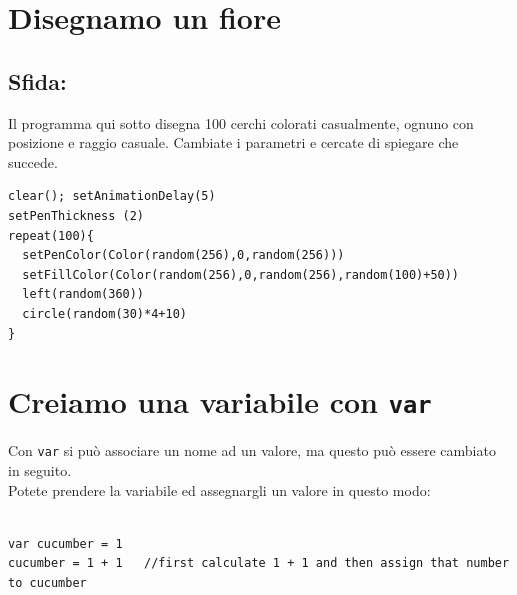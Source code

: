 \chapter{Disegnamo un fiore}\section*{\color{BrickRed}Sfida:}
Il programma qui sotto disegna 100 cerchi colorati casualmente, ognuno con posizione e raggio casuale. Cambiate i parametri e cercate di spiegare che succede.

  

\begin{lstlisting}[basicstyle={\ttfamily\fontsize{16}{19}\selectfont},numbers=none]
clear(); setAnimationDelay(5)
setPenThickness (2)
repeat(100){
  setPenColor(Color(random(256),0,random(256)))
  setFillColor(Color(random(256),0,random(256),random(100)+50))
  left(random(360))
  circle(random(30)*4+10)
}
\end{lstlisting}
        
\chapter{Creiamo una variabile con \lstinline{var}}Con \lstinline{var} si può associare un nome ad un valore, ma questo può essere cambiato in seguito.\\
Potete prendere la variabile ed assegnargli un valore in questo modo:

\begin{lstlisting}[numbers=none]

var cucumber = 1
cucumber = 1 + 1   //first calculate 1 + 1 and then assign that number to cucumber     
        
\end{lstlisting}
        
